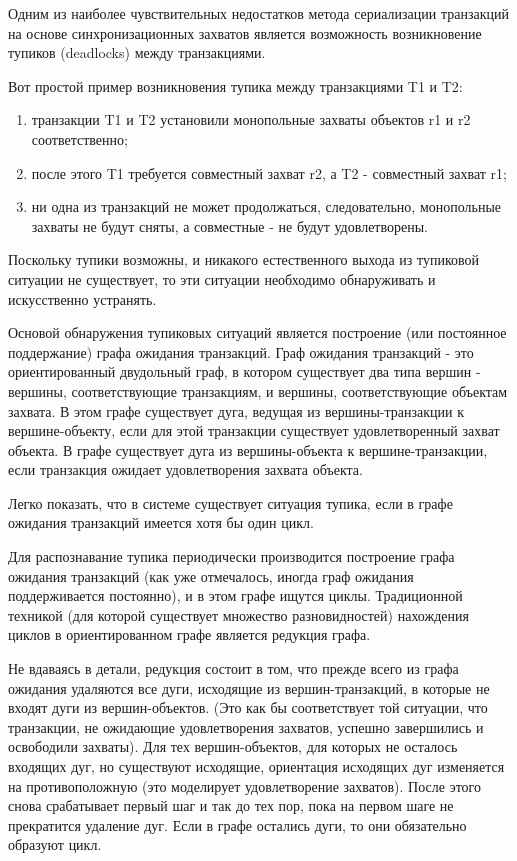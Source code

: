 Одним из наиболее чувствительных недостатков метода сериализации транзакций на основе синхронизационных захватов является возможность возникновение тупиков (deadlocks) между транзакциями.

Вот простой пример возникновения тупика между транзакциями T1 и T2:
\begin{enumerate}
\item транзакции T1 и T2 установили монопольные захваты объектов r1 и r2 соответственно;
\item после этого T1 требуется совместный захват r2, а T2 - совместный захват r1;
\item ни одна из транзакций не может продолжаться, следовательно, монопольные захваты не будут сняты, а совместные - не будут удовлетворены.
\end{enumerate}
Поскольку тупики возможны, и никакого естественного выхода из тупиковой ситуации не существует, то эти ситуации необходимо обнаруживать и искусственно устранять.

Основой обнаружения тупиковых ситуаций является построение (или постоянное поддержание) графа ожидания транзакций. Граф ожидания транзакций - это ориентированный двудольный граф, в котором существует два типа вершин - вершины, соответствующие транзакциям, и вершины, соответствующие объектам захвата. В этом графе существует дуга, ведущая из вершины-транзакции к вершине-объекту, если для этой транзакции существует удовлетворенный захват объекта. В графе существует дуга из вершины-объекта к вершине-транзакции, если транзакция ожидает удовлетворения захвата объекта.

Легко показать, что в системе существует ситуация тупика, если в графе ожидания транзакций имеется хотя бы один цикл.

Для распознавание тупика периодически производится построение графа ожидания транзакций (как уже отмечалось, иногда граф ожидания поддерживается постоянно), и в этом графе ищутся циклы. Традиционной техникой (для которой существует множество разновидностей) нахождения циклов в ориентированном графе является редукция графа.

Не вдаваясь в детали, редукция состоит в том, что прежде всего из графа ожидания удаляются все дуги, исходящие из вершин-транзакций, в которые не входят дуги из вершин-объектов. (Это как бы соответствует той ситуации, что транзакции, не ожидающие удовлетворения захватов, успешно завершились и освободили захваты). Для тех вершин-объектов, для которых не осталось входящих дуг, но существуют исходящие, ориентация исходящих дуг изменяется на противоположную (это моделирует удовлетворение захватов). После этого снова срабатывает первый шаг и так до тех пор, пока на первом шаге не прекратится удаление дуг. Если в графе остались дуги, то они обязательно образуют цикл.

